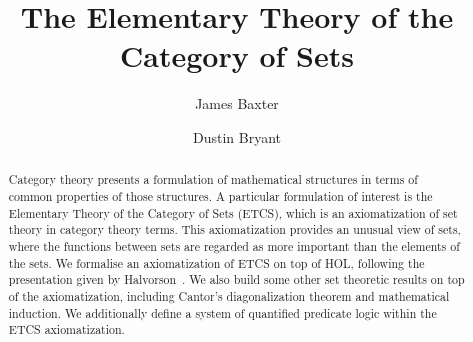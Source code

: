 \documentclass[11pt,a4paper]{article}
\begin{document}
\title{The Elementary Theory of the Category of Sets}
\author{James Baxter \and Dustin Bryant}
\maketitle

\begin{abstract}
  Category theory presents a formulation of mathematical structures in
  terms of common properties of those structures. 
  A particular formulation of interest is the Elementary Theory of the
  Category of Sets (ETCS), which is an axiomatization of set theory in
  category theory terms. 
  This axiomatization provides an unusual view of sets, where the
  functions between sets are regarded as more important than the
  elements of the sets. 
  We formalise an axiomatization of ETCS on top of HOL, following the
  presentation given by Halvorson~\cite{Halvorson2019}. 
  We also build some other set theoretic results on top of the
  axiomatization, including Cantor's diagonalization theorem and
  mathematical induction. 
  We additionally define a system of quantified predicate logic within the ETCS
  axiomatization.
\end{abstract}

\tableofcontents





\end{document}
